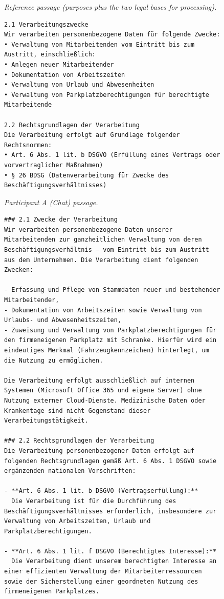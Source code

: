 \begin{figure}[!htbp]
\centering
\noindent\textit{Reference passage (purposes plus the two legal bases for processing).}
\begin{lstlisting}
2.1 Verarbeitungszwecke
Wir verarbeiten personenbezogene Daten für folgende Zwecke:
• Verwaltung von Mitarbeitenden vom Eintritt bis zum Austritt, einschließlich:
• Anlegen neuer Mitarbeitender
• Dokumentation von Arbeitszeiten
• Verwaltung von Urlaub und Abwesenheiten
• Verwaltung von Parkplatzberechtigungen für berechtigte Mitarbeitende

2.2 Rechtsgrundlagen der Verarbeitung
Die Verarbeitung erfolgt auf Grundlage folgender Rechtsnormen:
• Art. 6 Abs. 1 lit. b DSGVO (Erfüllung eines Vertrags oder vorvertraglicher Maßnahmen)
• § 26 BDSG (Datenverarbeitung für Zwecke des Beschäftigungsverhältnisses)
\end{lstlisting}

\noindent\textit{Participant A (Chat) passage.}
\begin{lstlisting}
### 2.1 Zwecke der Verarbeitung
Wir verarbeiten personenbezogene Daten unserer Mitarbeitenden zur ganzheitlichen Verwaltung von deren Beschäftigungsverhältnis – vom Eintritt bis zum Austritt aus dem Unternehmen. Die Verarbeitung dient folgenden Zwecken:

- Erfassung und Pflege von Stammdaten neuer und bestehender Mitarbeitender,
- Dokumentation von Arbeitszeiten sowie Verwaltung von Urlaubs- und Abwesenheitszeiten,
- Zuweisung und Verwaltung von Parkplatzberechtigungen für den firmeneigenen Parkplatz mit Schranke. Hierfür wird ein eindeutiges Merkmal (Fahrzeugkennzeichen) hinterlegt, um die Nutzung zu ermöglichen.

Die Verarbeitung erfolgt ausschließlich auf internen Systemen (Microsoft Office 365 und eigene Server) ohne Nutzung externer Cloud-Dienste. Medizinische Daten oder Krankentage sind nicht Gegenstand dieser Verarbeitungstätigkeit.

### 2.2 Rechtsgrundlagen der Verarbeitung
Die Verarbeitung personenbezogener Daten erfolgt auf folgenden Rechtsgrundlagen gemäß Art. 6 Abs. 1 DSGVO sowie ergänzenden nationalen Vorschriften:

- **Art. 6 Abs. 1 lit. b DSGVO (Vertragserfüllung):**
  Die Verarbeitung ist für die Durchführung des Beschäftigungsverhältnisses erforderlich, insbesondere zur Verwaltung von Arbeitszeiten, Urlaub und Parkplatzberechtigungen.

- **Art. 6 Abs. 1 lit. f DSGVO (Berechtigtes Interesse):**
  Die Verarbeitung dient unserem berechtigten Interesse an einer effizienten Verwaltung der Mitarbeiterressourcen sowie der Sicherstellung einer geordneten Nutzung des firmeneigenen Parkplatzes.


\end{lstlisting}
\end{figure}

